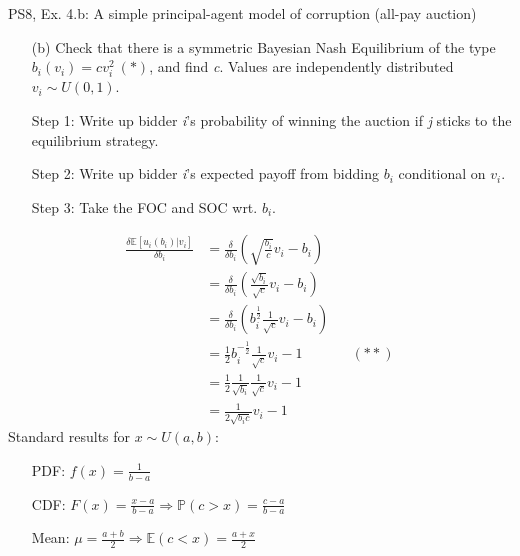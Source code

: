 \begin{frame}{PS8, Ex. 4.b: A simple principal-agent model of corruption (all-pay auction)}
    \begin{itemize}
      \item[(b)] Check that there is a symmetric Bayesian Nash Equilibrium of the type $b_i(v_i) = cv_i^2\ (*)$, and find \textit{c}. Values are independently distributed $v_i\sim U(0, 1)$.
    \end{itemize} \vspace{-8pt}
    \begin{multicols}{2}
      \begin{itemize}
        \item[Step 1:] Write up bidder \textit{i}'s probability of winning the auction if \textit{j} sticks to the equilibrium strategy.
        \item[Step 2:] Write up bidder \textit{i}'s expected payoff from bidding $b_i$ conditional on $v_i$.
        \item[Step 3:] Take the FOC and SOC wrt. $b_i$.
      \end{itemize} \vspace{-8pt}
      \begin{align*}
        \frac{\delta\mathbb{E}[u_i(b_i)|v_i]}{\delta b_i}
          &=\frac{\delta}{\delta b_i}\left(\sqrt{\frac{b_i}{c}}v_i-b_i\right)\\
          &=\frac{\delta}{\delta b_i}\left(\frac{\sqrt{b_i}}{\sqrt{c}}v_i-b_i\right)\\
          &=\frac{\delta}{\delta b_i}\left(b_i^{\frac{1}{2}}\frac{1}{\sqrt{c}}v_i-b_i\right)\\
          &=\frac{1}{2}b_i^{-\frac{1}{2}}\frac{1}{\sqrt{c}}v_i-1&&(**)\\
          &=\frac{1}{2}\frac{1}{\sqrt{b_i}}\frac{1}{\sqrt{c}}v_i-1\\
          &=\frac{1}{2\sqrt{b_ic}}v_i-1
      \end{align*}
      \vfill\null\columnbreak
      Standard results for $x\sim U(a, b):$ \vspace{-6pt}
      \begin{itemize}
        \item[PDF:] $f(x)=\frac{1}{b-a}$
        \item[CDF:] $F(x)=\frac{x-a}{b-a}\Rightarrow\mathbb{P}(c>x)=\frac{c-a}{b-a}$
        \item[Mean:] $\mu=\frac{a+b}{2}\Rightarrow\mathbb{E}(c<x)=\frac{a+x}{2}$
      \end{itemize}
      \vspace{-6pt}

\end{multicols}
\end{frame}

